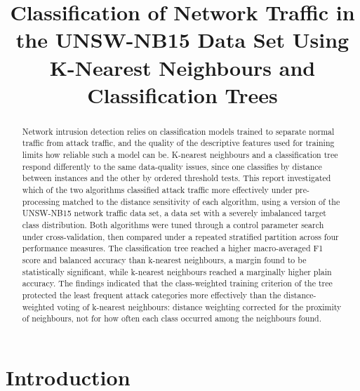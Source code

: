 \documentclass[10pt,conference]{IEEEtran}
\begin{document}
\title{Classification of Network Traffic in the UNSW-NB15 Data Set Using K-Nearest Neighbours and Classification Trees}

\author{
}

\maketitle
{}

\begin{abstract}
Network intrusion detection relies on classification models trained to separate normal traffic from attack traffic, and the quality of the descriptive features used for training limits how reliable such a model can be. K-nearest neighbours and a classification tree respond differently to the same data-quality issues, since one classifies by distance between instances and the other by ordered threshold tests. This report investigated which of the two algorithms classified attack traffic more effectively under pre-processing matched to the distance sensitivity of each algorithm, using a version of the UNSW-NB15 network traffic data set, a data set with a severely imbalanced target class distribution. Both algorithms were tuned through a control parameter search under cross-validation, then compared under a repeated stratified partition across four performance measures. The classification tree reached a higher macro-averaged F1 score and balanced accuracy than k-nearest neighbours, a margin found to be statistically significant, while k-nearest neighbours reached a marginally higher plain accuracy. The findings indicated that the class-weighted training criterion of the tree protected the least frequent attack categories more effectively than the distance-weighted voting of k-nearest neighbours: distance weighting corrected for the proximity of neighbours, not for how often each class occurred among the neighbours found.
\end{abstract}

\section{Introduction}
\label{sec:intro}
\end{document}
